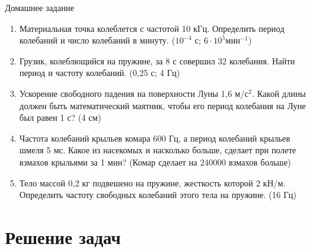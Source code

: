 \documentclass[a5paper, 10pt]{diss_4}
\renewcommand{\'}{\,'}
\begin{document}
\begin{center}
   Домашнее задание
\end{center}
\begin{enumerate}

\item Материальная точка колеблется с частотой 10 кГц. Определить период колебаний и число колебаний в минуту.
($10^{-4}$ с; $6\cdot10^5 мин^{-1}$)

\item Грузик, колеблющийся на пружине, за 8 с совершил 32 колебания. Найти период и частоту колебаний.
(0,25 с;    4 Гц)

\item Ускорение свободного падения на поверхности Луны 1,6 $м/с^2$. Какой длины должен быть математический маятник, чтобы его период колебания на Луне был равен 1 с? (4 см)

\item Частота колебаний крыльев комара 600 Гц, а период колебаний крыльев шмеля 5 мс. Какое из насекомых и насколько больше, сделает при полете взмахов крыльями за 1 мин? (Комар сделает на 240000 взмахов больше)

\item Тело массой 0,2 кг подвешено на пружине, жесткость которой 2 кН/м. Определить частоту свободных колебаний этого тела на пружине. (16 Гц)

\end{enumerate}

\section{Решение задач}
\end{document}
